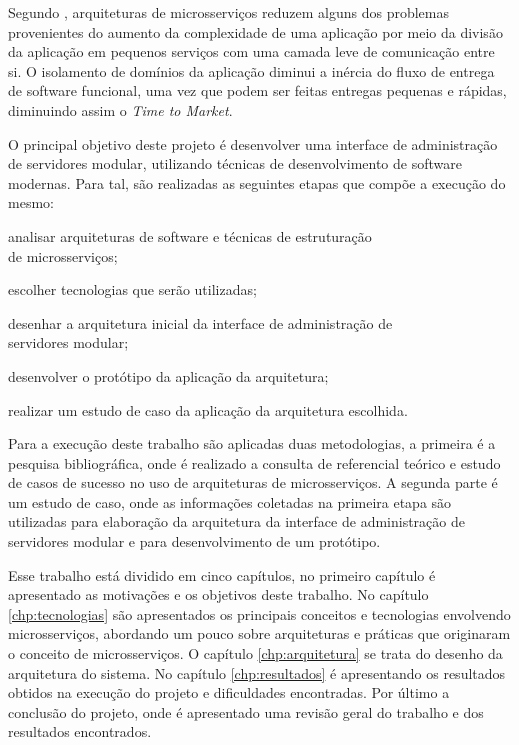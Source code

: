 Segundo , arquiteturas de microsserviços reduzem
alguns dos problemas provenientes do aumento da complexidade de uma aplicação
por meio da divisão da aplicação em pequenos serviços com uma camada leve
de comunicação entre si. O isolamento de domínios da aplicação diminui a
inércia do fluxo de entrega de software funcional, uma vez que podem ser
feitas entregas pequenas e rápidas, diminuindo assim o \emph{Time to Market}.

O principal objetivo deste projeto é desenvolver uma interface de
administração de servidores modular, utilizando técnicas de desenvolvimento
de software modernas. Para tal, são realizadas as seguintes etapas que compõe
a execução do mesmo:

\begin{alineas}
  \item analisar arquiteturas de software e técnicas de estruturação \\
    de microsserviços;
  \item escolher tecnologias que serão utilizadas;
  \item desenhar a arquitetura inicial da interface de administração de \\
    servidores modular;
  \item desenvolver o protótipo da aplicação da arquitetura;
  \item realizar um estudo de caso da aplicação da arquitetura escolhida.
\end{alineas}

Para a execução deste trabalho são aplicadas duas metodologias, a primeira
é a pesquisa bibliográfica, onde é realizado a consulta de referencial
teórico e estudo de casos de sucesso no uso de arquiteturas de microsserviços.
A segunda parte é um estudo de caso, onde as informações coletadas
na primeira etapa são utilizadas para elaboração da arquitetura da interface
de administração de servidores modular e para desenvolvimento de um protótipo.

Esse trabalho está dividido em cinco capítulos, no primeiro capítulo é
apresentado as motivações e os objetivos deste trabalho. No capítulo
\ref{chp:tecnologias} são apresentados os principais conceitos e tecnologias
envolvendo microsserviços, abordando um pouco sobre arquiteturas
e práticas que originaram o conceito de microsserviços. O capítulo
\ref{chp:arquitetura} se trata do desenho da arquitetura do sistema. No
capítulo \ref{chp:resultados} é apresentando os resultados obtidos na execução
do projeto e dificuldades encontradas. Por último a conclusão do projeto,
onde é apresentado uma revisão geral do trabalho e dos resultados encontrados.
